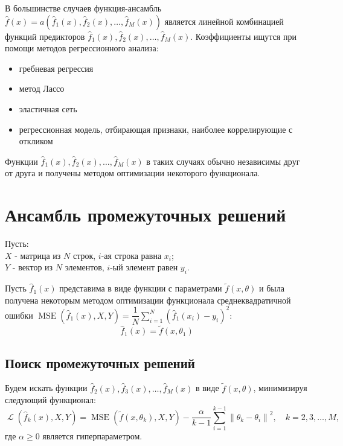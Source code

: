 \documentclass[12pt, fleqn]{article}
\newcommand{\norm}[1]{\left\lVert#1\right\rVert}
\newcommand{\loss}{\mathop{\mathcal{L}}}
\newcommand{\mse}{\mathop{MSE}}
\newcommand{\optimizationmethodfunction}{\tilde{f}}
\newcommand{\predictionfunction}{\hat{f}}
\newcommand{\ensemblefunction}{a}
\newcommand{\distinguishparameter}{\alpha}
\newcommand{\objects}{X}
\newcommand{\results}{Y}
\newcommand{\numberobjects}{N}
\newcommand{\numberpredictionfunctions}{M}
\newcommand{\for}[3]{\sum\limits_{#1 = #2}^{#3}}  %
\newcommand{\forn}[2]{\for{#1}{1}{#2}}  %
\newcommand{\many}[3]{#1 1 #2, #1 2 #2, \dots, #1 #3 #2}  %
\newcommand{\ensemblefunctionfull}{\ensemblefunction(\many{\predictionfunction_}{(x)}{\numberpredictionfunctions})}
\begin{document}
В большинстве случаев функция-ансамбль $\predictionfunction(x) = \ensemblefunctionfull$ является линейной комбинацией функций предикторов $\many{\predictionfunction_}{(x)}{\numberpredictionfunctions}$. Коэффициенты ищутся при помощи методов регрессионного анализа:
\begin{itemize}
\item гребневая регрессия~\cite{Ridge}
\item метод Лассо~\cite{Lasso}
\item эластичная сеть~\cite{ElasticNet}
\item регрессионная модель, отбирающая признаки, наиболее коррелирующие с откликом~\cite{ConvexCombinationsBestCorrelatedWithResponse}
\end{itemize}

Функции $\many{\predictionfunction_}{(x)}{\numberpredictionfunctions}$ в таких случаях обычно независимы друг от друга и получены методом оптимизации некоторого функционала.

\section{Ансамбль промежуточных решений}

Пусть:\\
$\objects$ - матрица из $\numberobjects$ строк, $i$-ая строка равна $x_i$;\\
$\results$ - вектор из $\numberobjects$ элементов, $i$-ый элемент равен $y_i$.

Пусть $\predictionfunction_1(x)$ представима в виде функции с параметрами $\optimizationmethodfunction(x, \theta)$ и была получена некоторым методом оптимизации функционала среднеквадратичной ошибки
$\mse(\predictionfunction_1(x), \objects, \results) = \dfrac{1}{\numberobjects}\forn{i}{\numberobjects} (\predictionfunction_1(x_i) - y_i)^2$:
$$\predictionfunction_1(x) = \optimizationmethodfunction(x, \theta_1)$$

\subsection{Поиск промежуточных решений}

Будем искать функции $\predictionfunction_2(x), \predictionfunction_3(x), \dots, \predictionfunction_\numberpredictionfunctions(x)$ в виде $\optimizationmethodfunction(x, \theta)$, минимизируя следующий функционал:
$$
\loss(\predictionfunction_k(x), \objects, \results) = \mse(\optimizationmethodfunction(x, \theta_k), \objects, \results) -
\dfrac{\distinguishparameter}{k - 1}
\forn{i}{k - 1}\norm{\theta_k - \theta_i}^2, \quad k = 2, 3, \dots, \numberpredictionfunctions,
$$
где $\distinguishparameter \geq 0$ является гиперпараметром.
\end{document}
